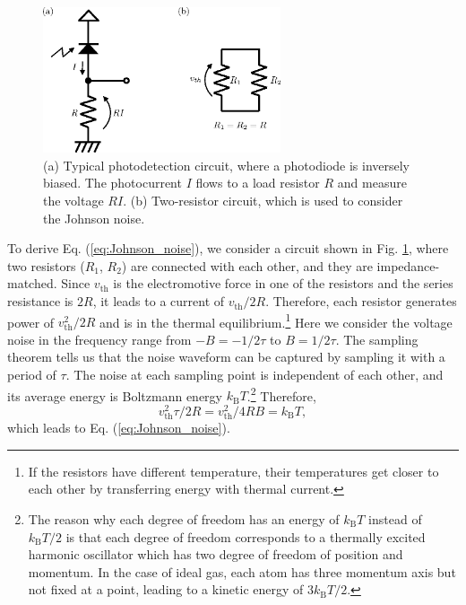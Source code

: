 \begin{figure}
  \centering
  \includegraphics[width=7cm]{fig/2-2_PD_circuit.eps} 
  \caption{(a) Typical photodetection circuit, where a photodiode is inversely biased. The photocurrent $I$ flows to a load resistor $R$ and measure the voltage $RI$. (b) Two-resistor  circuit, which is used to consider the Johnson noise.}
  \label{fig:photodetector}
\end{figure}

To derive Eq. (\ref{eq:Johnson_noise}), we consider a circuit shown in Fig. \ref{fig:photodetector}, where two resistors ($R_1$, $R_2$) are connected with each other, and they are impedance-matched.\cite{nyquist1928} Since $v_\mathrm{th}$ is the electromotive force in one of the resistors and the series resistance is $2R$, it leads to a current of $v_\mathrm{th}/2R$. Therefore, each resistor generates power of $v_\mathrm{th}^2/2R$ and is in the thermal equilibrium.\footnote{If the resistors have different temperature, their temperatures get closer to each other by transferring energy with thermal current.} Here we consider the voltage noise in the frequency range from $-B = -1/2\tau$ to $B = 1/2\tau$. The sampling theorem tells us that the noise waveform can be captured by sampling it with a period of $\tau$. The noise at each sampling point is independent of each other, and its average energy is Boltzmann energy $k_\mathrm BT$.\footnote{The reason why each degree of freedom has an energy of $k_\mathrm B T$ instead of $k_\mathrm B T/2$ is that each degree of freedom corresponds to a thermally excited harmonic oscillator which has two degree of freedom of position and momentum. In the case of ideal gas, each atom has three momentum axis but not fixed at a point, leading to a kinetic energy of $3k_\mathrm B T / 2$.} Therefore,
\begin{equation}
v_\mathrm{th}^2\tau/2R = v_\mathrm{th}^2 / 4RB = k_\mathrm{B}T,
\end{equation}
which leads to Eq. (\ref{eq:Johnson_noise}).

